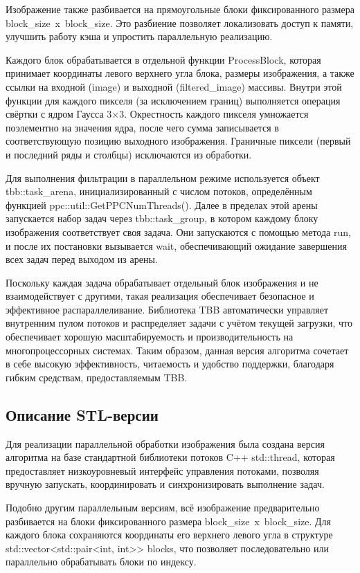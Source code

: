 \documentclass[14pt, a4paper]{extarticle}
\newcommand{\code}[1]{{\ttfamily\fontsize{14pt}{16pt}\selectfont #1}}
\begin{document}
Изображение также разбивается на прямоугольные блоки фиксированного размера  \code{block\_size~x~block\_size}. Это разбиение позволяет локализовать доступ к памяти, улучшить работу кэша и упростить параллельную реализацию.

Каждого блок обрабатывается в отдельной функции \code{ProcessBlock}, которая принимает координаты левого верхнего угла блока, размеры изображения, а также ссылки на входной (\code{image}) и выходной (\code{filtered\_image}) массивы. Внутри этой функции для каждого пикселя (за исключением границ) выполняется операция свёртки с ядром Гаусса 3×3. Окрестность каждого пикселя умножается поэлементно на значения ядра, после чего сумма записывается в соответствующую позицию выходного изображения. Граничные пиксели (первый и последний ряды и столбцы) исключаются из обработки.

Для выполнения фильтрации в параллельном режиме используется объект \code{tbb::task\_arena}, инициализированный с числом потоков, определённым функцией \code{ppc::util::GetPPCNumThreads()}. Далее в пределах этой арены запускается набор задач через \code{tbb::task\_group}, в котором каждому блоку изображения соответствует своя задача. Они запускаются с помощью метода \code{run}, и после их постановки вызывается \code{wait}, обеспечивающий ожидание завершения всех задач перед выходом из арены.

Поскольку каждая задача обрабатывает отдельный блок изображения и не взаимодействует с другими, такая реализация обеспечивает безопасное и эффективное распараллеливание. Библиотека TBB автоматически управляет внутренним пулом потоков и распределяет задачи с учётом текущей загрузки, что обеспечивает хорошую масштабируемость и производительность на многопроцессорных системах. Таким образом, данная версия алгоритма сочетает в себе высокую эффективность, читаемость и удобство поддержки, благодаря гибким средствам, предоставляемым TBB.


\subsection{Описание STL-версии}
Для реализации параллельной обработки изображения была создана версия алгоритма на базе стандартной библиотеки потоков C++ std::thread, которая предоставляет низкоуровневый интерфейс управления потоками, позволяя вручную запускать, координировать и синхронизировать выполнение задач.

Подобно другим параллельным версиям, всё изображение предварительно разбивается на блоки фиксированного размера \code{block\_size~x~block\_size}. Для каждого блока сохраняются координаты его верхнего левого угла в структуре  \code{std::vector<std::pair<int, int>> blocks}, что позволяет последовательно или параллельно обрабатывать блоки по индексу.
\end{document}
